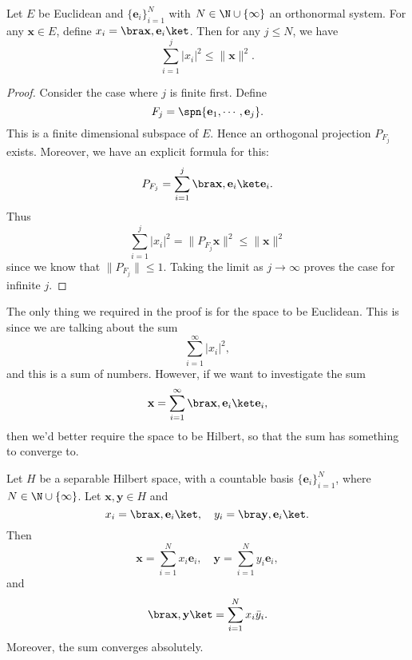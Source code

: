 \documentclass[a4paper]{article}
\begin{document}
\begin{lemma}
  Let $E$ be Euclidean and $\{\mathbf{e}_i\}_{i = 1}^N$ with $N \in \N \cup \{\infty\}$ an orthonormal system. For any $\mathbf{x} \in E$, define $x_i = \bra \mathbf{x}, \mathbf{e}_i\ket$. Then for any $j \leq N$, we have
  \[
    \sum_{i = 1}^j |x_i|^2 \leq \|\mathbf{x}\|^2.
  \]
\end{lemma}

\begin{proof}
  Consider the case where $j$ is finite first. Define
  \[
    F_j = \spn\{\mathbf{e}_1, \cdots, \mathbf{e}_j\}.
  \]
  This is a finite dimensional subspace of $E$. Hence an orthogonal projection $P_{F_j}$ exists. Moreover, we have an explicit formula for this:
  \[
    P_{F_j} = \sum_{i = 1}^j \bra \mathbf{x}, \mathbf{e}_i\ket \mathbf{e}_i.
  \]
  Thus
  \[
    \sum_{i = 1}^j |x_i|^2 = \|P_{F_j} \mathbf{x}\|^2 \leq \|\mathbf{x}\|^2
  \]
  since we know that $\|P_{F_j}\| \leq 1$. Taking the limit as $j \to \infty$ proves the case for infinite $j$.
\end{proof}

The only thing we required in the proof is for the space to be Euclidean. This is since we are talking about the sum
\[
  \sum_{i = 1}^\infty |x_i|^2,
\]
and this is a sum of numbers. However, if we want to investigate the sum
\[
  \mathbf{x} = \sum_{i = 1}^\infty \bra \mathbf{x}, \mathbf{e}_i\ket \mathbf{e}_i,
\]
then we'd better require the space to be Hilbert, so that the sum has something to converge to.

\begin{prop}
  Let $H$ be a separable Hilbert space, with a countable basis $\{\mathbf{e}_i\}_{i = 1}^N$, where $N \in \N \cup \{\infty\}$. Let $\mathbf{x}, \mathbf{y} \in H$ and
  \[
    x_i = \bra \mathbf{x}, \mathbf{e}_i\ket ,\quad y_i = \bra \mathbf{y}, \mathbf{e}_i\ket.
  \]
  Then
  \[
    \mathbf{x} = \sum_{i = 1}^N x_i \mathbf{e}_i,\quad \mathbf{y} = \sum_{i = 1}^N y_i \mathbf{e}_i,
  \]
  and
  \[
    \bra \mathbf{x}, \mathbf{y}\ket = \sum_{i = 1}^N x_i \bar{y}_i.
  \]
  Moreover, the sum converges absolutely.
\end{prop}
\end{document}
